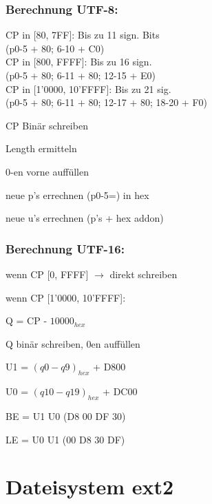 \begin{multicols*}{5}
\begin{tabular}{ r | r | r}
\end{tabular}


\subsubsection{Berechnung UTF-8:}
CP in \textcolor{h}{[80, 7FF]:} Bis zu 11 sign. Bits\\
(p0-5 + 80; 6-10 + C0)\\
CP in \textcolor{h}{[800, FFFF]:} Bis zu 16 sign.\\
(p0-5 + 80; 6-11 + 80; 12-15 + E0)\\
CP in \textcolor{h}{[1'0000, 10'FFFF]:} Bis zu 21 sig.\\
(p0-5 + 80; 6-11 + 80; 12-17 + 80; 18-20 + F0)\\

\begin{compactenum}[1.]
	\item CP Binär schreiben
	\item Length ermitteln
	\item 0-en vorne auffüllen
	\item neue p's errechnen (p0-5=) in hex
	\item neue u's errechnen (p's + hex addon)
\end{compactenum}

\subsubsection{Berechnung UTF-16:}
\begin{compactenum}[1.]
	\item wenn CP [0, FFFF] $\rightarrow$ direkt schreiben
	\item wenn CP [1'0000, 10'FFFF]:
	\item Q = CP - $10000_{hex}$
	\item Q binär schreiben, 0en auffüllen
	\item U1 = $(q0-q9)_{hex}$ + D800
	\item U0 = $(q10-q19)_{hex}$ + DC00
	\item BE = U1 U0 (D8 00 DF 30)
	\item LE = U0 U1 (00 D8 30 DF)
\end{compactenum}







\vfill
\columnbreak



\section{Dateisystem ext2}


\end{multicols*}
